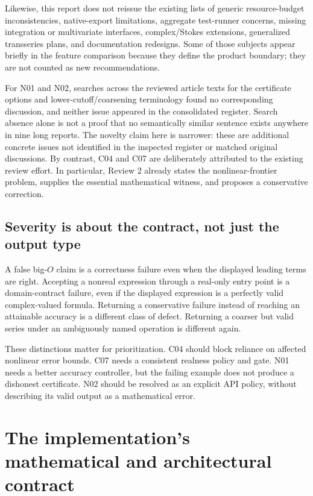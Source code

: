 \documentclass[11pt,letterpaper]{article}
\begin{document}
Likewise, this report does not reissue the existing lists of generic resource-budget inconsistencies, native-export limitations, aggregate test-runner concerns, missing integration or multivariate interfaces, complex/Stokes extensions, generalized transseries plans, and documentation redesigns. Some of those subjects appear briefly in the feature comparison because they define the product boundary; they are not counted as new recommendations.

For N01 and N02, searches across the reviewed article texts for the certificate options and lower-cutoff/coarsening terminology found no corresponding discussion, and neither issue appeared in the consolidated register. Search absence alone is not a proof that no semantically similar sentence exists anywhere in nine long reports. The novelty claim here is narrower: these are additional concrete issues not identified in the inspected register or matched original discussions. By contrast, C04 and C07 are deliberately attributed to the existing review effort. In particular, Review 2 already states the nonlinear-frontier problem, supplies the essential mathematical witness, and proposes a conservative correction.\cite{repo-status,review2}

\subsection{Severity is about the contract, not just the output type}
A false big-$O$ claim is a correctness failure even when the displayed leading terms are right. Accepting a nonreal expression through a real-only entry point is a domain-contract failure, even if the displayed expression is a perfectly valid complex-valued formula. Returning a conservative failure instead of reaching an attainable accuracy is a different class of defect. Returning a coarser but valid series under an ambiguously named operation is different again.

These distinctions matter for prioritization. C04 should block reliance on affected nonlinear error bounds. C07 needs a consistent realness policy and gate. N01 needs a better accuracy controller, but the failing example does not produce a dishonest certificate. N02 should be resolved as an explicit API policy, without describing its valid output as a mathematical error.

\section{The implementation's mathematical and architectural contract}
\label{sec:architecture}
\end{document}

